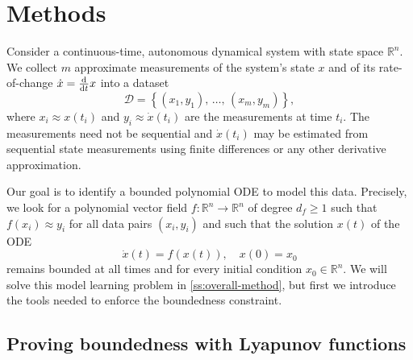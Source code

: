 \documentclass[11pt]{amsart}
\numberwithin{equation}{section}
\theoremstyle{plain}
\theoremstyle{definition}
\theoremstyle{remark}
\newcommand{\R}{\mathbb{R}}
\renewcommand{\vec}[1]{{#1}}
\newcommand{\ddt}{\frac{\rm d}{{\rm d} t}}
\begin{document}
\section{Methods}\label{s:methods}

Consider a continuous-time, autonomous dynamical system with state space $\R^n$. We collect $m$ approximate measurements of the system's state $\vec{x}$ and of its rate-of-change $\dot{\vec{x}}=\ddt\vec{x}$ into a dataset
\begin{equation}\label{e:dataset}
    \mathcal{D} = \left\{ (\vec{x}_1,\vec{y}_1), \, \ldots,\, (\vec{x}_m, \vec{y}_m)\right\},
\end{equation}
where $\vec{x}_i \approx \vec{x}(t_i)$ and $\vec{y}_i \approx \dot{\vec{x}}(t_i)$ are the measurements at time $t_i$. The measurements need not be sequential and $\dot{x}(t_i)$ may be estimated from sequential state measurements using finite differences or any other derivative approximation.

Our goal is to identify a bounded polynomial ODE to model this data. Precisely, we look for a polynomial vector field $f:\R^n \to \R^n$  of degree $d_f \geq 1$ such that $f(\vec{x}_i)\approx \vec{y}_i$ for all data pairs $(\vec{x}_i,\vec{y}_i)$ and such that the solution $\vec{x}(t)$ of the ODE
\begin{equation}\label{e:ode}
    \dot{\vec{x}}(t) = \vec{f}(\vec{x}(t)),\quad \vec{x}(0)=\vec{x}_0
\end{equation}
remains bounded at all times and for every initial condition $\vec{x}_0 \in \R^n$. We will solve this model learning problem in \cref{ss:overall-method}, but first we introduce the tools needed to enforce the boundedness constraint.


\subsection{Proving boundedness with Lyapunov functions}\label{ss:lyapunov-functions}
\end{document}

